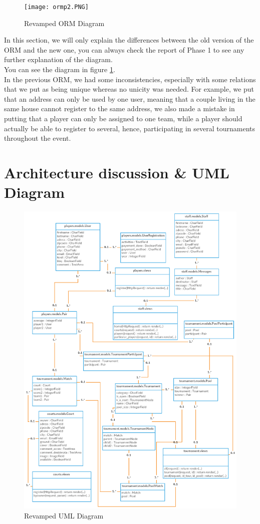 \documentclass[a4paper, 12pt]{article}
\begin{document}
\begin{figure}[h]
\caption{\label{orm2} Revamped ORM Diagram}
\texttt{[image: ormp2.PNG]}
\end{figure}

In this section, we will only explain the differences between the old version of the ORM and the new one, you can always check the report of Phase 1 to see any further explanation of the diagram. \\


You can see the diagram in figure \ref{orm2}.\\

In the previous ORM, we had some inconsistencies, especially with some relations that we put as being unique whereas no unicity was needed. For example, we put that an address can only be used by one user, meaning that a couple living in the same house cannot register to the same address, we also made a mistake in putting that a player can only be assigned to one team, while a player should actually be able to register to several, hence, participating in several tournaments throughout the event.\\
 
\newpage
\section{Architecture discussion \& UML Diagram}

\begin{figure}[h]
\caption{\label{uml2} Revamped UML Diagram}
\includegraphics[scale=0.6]{UMLp2.PNG}
\end{figure}
\end{document}
